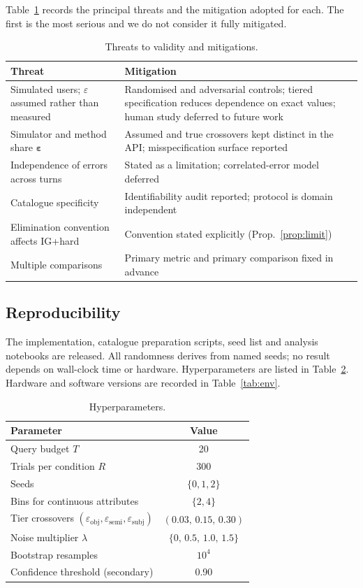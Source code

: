 \documentclass[conference]{IEEEtran}
\begin{document}
Table~\ref{tab:threats} records the principal threats and the mitigation
adopted for each. The first is the most serious and we do not consider it fully
mitigated.

\begin{table}[t]
\caption{Threats to validity and mitigations.}
\label{tab:threats}
\centering
\footnotesize
\begin{tabular}{@{}p{}p{}@{}}
\toprule
\textbf{Threat} & \textbf{Mitigation} \\
\midrule
Simulated users; $\varepsilon$ assumed rather than measured & Randomised and adversarial controls; tiered specification reduces dependence on exact values; human study deferred to future work \\
Simulator and method share $\boldsymbol\varepsilon$ & Assumed and true crossovers kept distinct in the API; misspecification surface reported \\
Independence of errors across turns & Stated as a limitation; correlated-error model deferred \\
Catalogue specificity & Identifiability audit reported; protocol is domain independent \\
Elimination convention affects IG+hard & Convention stated explicitly (Prop.~\ref{prop:limit}) \\
Multiple comparisons & Primary metric and primary comparison fixed in advance \\
\bottomrule
\end{tabular}
\end{table}

\subsection{Reproducibility}

The implementation, catalogue preparation scripts, seed list and analysis
notebooks are released. All randomness derives from named seeds; no result
depends on wall-clock time or hardware. Hyperparameters are listed in
Table~\ref{tab:hyper}. Hardware and software versions are recorded in
Table~\ref{tab:env}.

\begin{table}[t]
\caption{Hyperparameters.}
\label{tab:hyper}
\centering
\footnotesize
\begin{tabular}{@{}lc@{}}
\toprule
\textbf{Parameter} & \textbf{Value} \\
\midrule
Query budget $T$ & 20 \\
Trials per condition $R$ & 300 \\
Seeds & $\{0,1,2\}$ \\
Bins for continuous attributes & $\{2,4\}$ \\
Tier crossovers $(\varepsilon_{\text{obj}},\varepsilon_{\text{semi}},\varepsilon_{\text{subj}})$ & $(0.03,\,0.15,\,0.30)$ \\
Noise multiplier $\lambda$ & $\{0,\,0.5,\,1.0,\,1.5\}$ \\
Bootstrap resamples & $10^4$ \\
Confidence threshold (secondary) & 0.90 \\
\bottomrule
\end{tabular}
\end{table}
\end{document}
